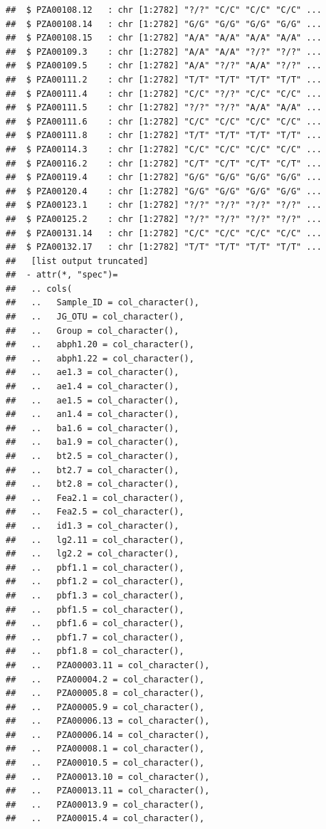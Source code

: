 \documentclass[
]{article}
\begin{document}
\begin{verbatim}
##  $ PZA00108.12   : chr [1:2782] "?/?" "C/C" "C/C" "C/C" ...
##  $ PZA00108.14   : chr [1:2782] "G/G" "G/G" "G/G" "G/G" ...
##  $ PZA00108.15   : chr [1:2782] "A/A" "A/A" "A/A" "A/A" ...
##  $ PZA00109.3    : chr [1:2782] "A/A" "A/A" "?/?" "?/?" ...
##  $ PZA00109.5    : chr [1:2782] "A/A" "?/?" "A/A" "?/?" ...
##  $ PZA00111.2    : chr [1:2782] "T/T" "T/T" "T/T" "T/T" ...
##  $ PZA00111.4    : chr [1:2782] "C/C" "?/?" "C/C" "C/C" ...
##  $ PZA00111.5    : chr [1:2782] "?/?" "?/?" "A/A" "A/A" ...
##  $ PZA00111.6    : chr [1:2782] "C/C" "C/C" "C/C" "C/C" ...
##  $ PZA00111.8    : chr [1:2782] "T/T" "T/T" "T/T" "T/T" ...
##  $ PZA00114.3    : chr [1:2782] "C/C" "C/C" "C/C" "C/C" ...
##  $ PZA00116.2    : chr [1:2782] "C/T" "C/T" "C/T" "C/T" ...
##  $ PZA00119.4    : chr [1:2782] "G/G" "G/G" "G/G" "G/G" ...
##  $ PZA00120.4    : chr [1:2782] "G/G" "G/G" "G/G" "G/G" ...
##  $ PZA00123.1    : chr [1:2782] "?/?" "?/?" "?/?" "?/?" ...
##  $ PZA00125.2    : chr [1:2782] "?/?" "?/?" "?/?" "?/?" ...
##  $ PZA00131.14   : chr [1:2782] "C/C" "C/C" "C/C" "C/C" ...
##  $ PZA00132.17   : chr [1:2782] "T/T" "T/T" "T/T" "T/T" ...
##   [list output truncated]
##  - attr(*, "spec")=
##   .. cols(
##   ..   Sample_ID = col_character(),
##   ..   JG_OTU = col_character(),
##   ..   Group = col_character(),
##   ..   abph1.20 = col_character(),
##   ..   abph1.22 = col_character(),
##   ..   ae1.3 = col_character(),
##   ..   ae1.4 = col_character(),
##   ..   ae1.5 = col_character(),
##   ..   an1.4 = col_character(),
##   ..   ba1.6 = col_character(),
##   ..   ba1.9 = col_character(),
##   ..   bt2.5 = col_character(),
##   ..   bt2.7 = col_character(),
##   ..   bt2.8 = col_character(),
##   ..   Fea2.1 = col_character(),
##   ..   Fea2.5 = col_character(),
##   ..   id1.3 = col_character(),
##   ..   lg2.11 = col_character(),
##   ..   lg2.2 = col_character(),
##   ..   pbf1.1 = col_character(),
##   ..   pbf1.2 = col_character(),
##   ..   pbf1.3 = col_character(),
##   ..   pbf1.5 = col_character(),
##   ..   pbf1.6 = col_character(),
##   ..   pbf1.7 = col_character(),
##   ..   pbf1.8 = col_character(),
##   ..   PZA00003.11 = col_character(),
##   ..   PZA00004.2 = col_character(),
##   ..   PZA00005.8 = col_character(),
##   ..   PZA00005.9 = col_character(),
##   ..   PZA00006.13 = col_character(),
##   ..   PZA00006.14 = col_character(),
##   ..   PZA00008.1 = col_character(),
##   ..   PZA00010.5 = col_character(),
##   ..   PZA00013.10 = col_character(),
##   ..   PZA00013.11 = col_character(),
##   ..   PZA00013.9 = col_character(),
##   ..   PZA00015.4 = col_character(),

\end{verbatim}
\end{document}
